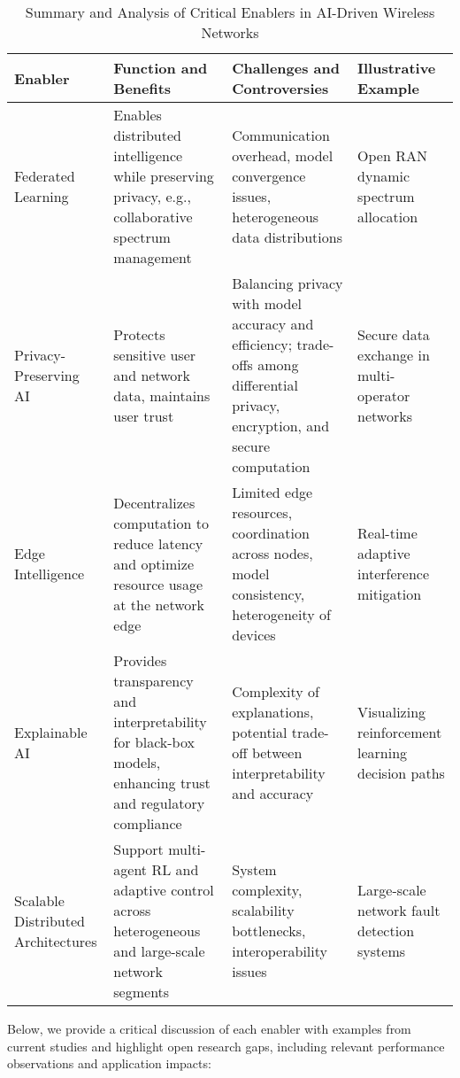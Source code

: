 \documentclass[sigconf]{acmart}
\begin{document}
\begin{table*}[htbp]
\centering
\caption{Summary and Analysis of Critical Enablers in AI-Driven Wireless Networks}
\label{tab:critical_enablers}
\begin{adjustbox}{max width=\textwidth}
\begin{tabular}{@{}llll@{}}
\toprule
\textbf{Enabler} & \textbf{Function and Benefits} & \textbf{Challenges and Controversies} & \textbf{Illustrative Example} \\ \midrule
Federated Learning & Enables distributed intelligence while preserving privacy, e.g., collaborative spectrum management & Communication overhead, model convergence issues, heterogeneous data distributions & Open RAN dynamic spectrum allocation \cite{ref49} \\
Privacy-Preserving AI & Protects sensitive user and network data, maintains user trust & Balancing privacy with model accuracy and efficiency; trade-offs among differential privacy, encryption, and secure computation & Secure data exchange in multi-operator networks \\
Edge Intelligence & Decentralizes computation to reduce latency and optimize resource usage at the network edge & Limited edge resources, coordination across nodes, model consistency, heterogeneity of devices & Real-time adaptive interference mitigation \\
Explainable AI & Provides transparency and interpretability for black-box models, enhancing trust and regulatory compliance & Complexity of explanations, potential trade-off between interpretability and accuracy \cite{ref50} & Visualizing reinforcement learning decision paths \\
Scalable Distributed Architectures & Support multi-agent RL and adaptive control across heterogeneous and large-scale network segments & System complexity, scalability bottlenecks, interoperability issues & Large-scale network fault detection systems \\ \bottomrule
\end{tabular}
\end{adjustbox}
\end{table*}

Below, we provide a critical discussion of each enabler with examples from current studies and highlight open research gaps, including relevant performance observations and application impacts:
\end{document}
